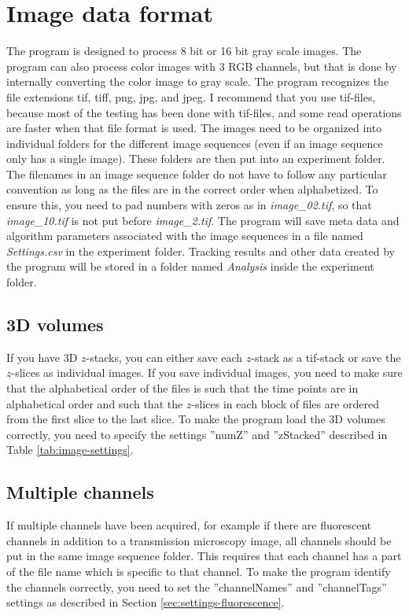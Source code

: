 \documentclass[a4paper, oneside, onecolumn, 11pt]{article}
\newcommand{\file}[1]{\emph{#1}}
\newcommand{\setting}[1]{''#1''}
\begin{document}
\section{Image data format}
\label{sec:image-data-format}
The program is designed to process 8 bit or 16 bit gray scale images. The program can also process color images with 3 RGB channels, but that is done by internally converting the color image to gray scale. The program recognizes the file extensions tif, tiff, png, jpg, and jpeg. I recommend that you use tif-files, because most of the testing has been done with tif-files, and some read operations are faster when that file format is used. The images need to be organized into individual folders for the different image sequences (even if an image sequence only has a single image). These folders are then put into an experiment folder. The filenames in an image sequence folder do not have to follow any particular convention as long as the files are in the correct order when alphabetized. To ensure this, you need to pad numbers with zeros as in \file{image\_02.tif}, so that \file{image\_10.tif} is not put before \file{image\_2.tif}. The program will save meta data and algorithm parameters associated with the image sequences in a file named \file{Settings.csv} in the experiment folder. Tracking results and other data created by the program will be stored in a folder named \file{Analysis} inside the experiment folder.

\subsection{3D volumes}
If you have 3D $z$-stacks, you can either save each $z$-stack as a tif-stack or save the $z$-slices as individual images. If you save individual images, you need to make sure that the alphabetical order of the files is such that the time points are in alphabetical order and such that the $z$-slices in each block of files are ordered from the first slice to the last slice. To make the program load the 3D volumes correctly, you need to specify the settings \setting{numZ} and \setting{zStacked} described in Table \ref{tab:image-settings}.

\subsection{Multiple channels}
If multiple channels have been acquired, for example if there are fluorescent channels in addition to a transmission microscopy image, all channels should be put in the same image sequence folder. This requires that each channel has a part of the file name which is specific to that channel. To make the program identify the channels correctly, you need to set the \setting{channelNames} and \setting{channelTags} settings as described in Section \ref{sec:settings-fluorescence}.
\end{document}
